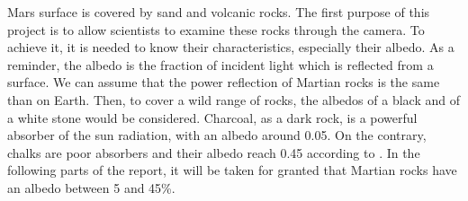 \label{albedo}
Mars surface is covered by sand and volcanic rocks. The first purpose of this project is to allow scientists to examine these rocks through the camera. To achieve it, it is needed to know their characteristics, especially their albedo. As a reminder, the albedo is the fraction of incident light which is reflected from a surface. We can assume that the power reflection of Martian rocks is the same than on Earth. Then, to cover a wild range of rocks, the albedos of a black and of a white stone would be considered. Charcoal, as a dark rock, is a powerful absorber of the sun radiation, with an albedo around 0.05. On the contrary, chalks are poor absorbers and their albedo reach 0.45 according to \cite{albedo}. In the following parts of the report, it will be taken for granted that Martian rocks have an albedo between 5 and 45\%.
